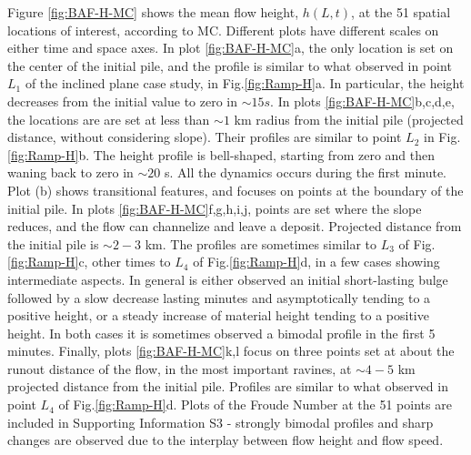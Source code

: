 \documentclass{article}
\begin{document}
Figure \ref{fig:BAF-H-MC} shows the mean flow height, $h(L,t)$, at the 51 spatial locations of interest, according to MC. Different plots have different scales on either time and space axes. In plot \ref{fig:BAF-H-MC}a, the only location is set on the center of the initial pile, and the profile is similar to what observed in point $L_1$ of the inclined plane case study, in Fig.\ref{fig:Ramp-H}a. In particular, the height decreases from the initial value to zero in $\sim 15 s$. In plots \ref{fig:BAF-H-MC}b,c,d,e, the locations are are set at less than $\sim 1$ km radius from the initial pile (projected distance, without considering slope). Their profiles are similar to point $L_2$ in Fig.\ref{fig:Ramp-H}b. The height profile is bell-shaped, starting from zero and then waning back to zero in $\sim 20$ s. All the dynamics occurs during the first minute. Plot (b) shows transitional features, and focuses on points at the boundary of the initial pile. In plots \ref{fig:BAF-H-MC}f,g,h,i,j, points are set where the slope reduces, and the flow can channelize and leave a deposit. Projected distance from the initial pile is $\sim 2-3$ km. The profiles are sometimes similar to $L_3$ of Fig.\ref{fig:Ramp-H}c, other times to $L_4$ of Fig.\ref{fig:Ramp-H}d, in a few cases showing intermediate aspects. In general is either observed an initial short-lasting bulge followed by a slow decrease lasting minutes and asymptotically tending to a positive height, or a steady increase of material height tending to a positive height. In both cases it is sometimes observed a bimodal profile in the first 5 minutes. Finally, plots \ref{fig:BAF-H-MC}k,l focus on three points set at about the runout distance of the flow, in the most important ravines, at $\sim 4-5$ km projected distance from the initial pile. Profiles are similar to what observed in point $L_4$ of Fig.\ref{fig:Ramp-H}d. Plots of the Froude Number at the 51 points are included in Supporting Information S3 - strongly bimodal profiles and sharp changes are observed due to the interplay between flow height and flow speed.
\end{document}
